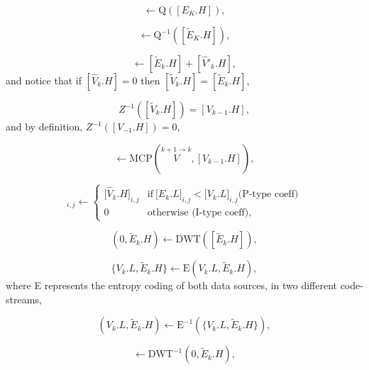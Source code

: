 \begin{equation}
  [\tilde{E}_k.H] \leftarrow \text{Q}([E_K.H]),
  \tag{d}
\end{equation}

\begin{equation}
  [\tilde{E}_k.H] \leftarrow  \text{Q}^{-1}([\tilde{E}_K.H]),
  \tag{E.g}
\end{equation}

\begin{equation}
  [\tilde{V}_k.H] \leftarrow [\tilde{E}_k.H] + [\hat{V}'_k.H],
  \tag{E.h}
\end{equation}
and notice that if $[\hat{V}_k.H]=0$ then $[\tilde{V}_k.H] =
[\tilde{E}_k.H]$,

\begin{equation}
  Z^{-1}([\tilde{V}_k.H]) = [V_{k-1}.H],
  \tag{E.i}
\end{equation}
and by definition, $Z^{-1}([V_{-1}.H]) = 0$,

\begin{equation}
  [\hat{V}_k.H] \leftarrow \text{MCP}(\overset{k+1\rightarrow k}{V}, [V_{k-1}.H]),
  \tag{E.j}
\end{equation}

\begin{equation}
  [\hat{V}'_k.H]_{i,j} \leftarrow \left\{
    \begin{array}{ll}
      {[}\hat{V}_k.H{]}_{i,j}  & \text{if}~{[}E_k.L{]}_{i,j} < {[}V_k.L{]}_{i,j} \text{(P-type coeff)} \\
      0                       & \text{otherwise (I-type coeff)},
    \end{array}
  \right.
  \tag{E.k}
\end{equation}
  
\begin{equation}
  (0, \tilde{E}_k.H) \leftarrow \text{DWT}([\tilde{E}_k.H]),
  \tag{f}
\end{equation}

\begin{equation}
  \{V_k.L, \tilde{E}_k.H\} \leftarrow \text{E}(V_k.L, \tilde{E}_k.H),
  \tag{g}
\end{equation}
where E represents the entropy coding of both data sources, in two
different code-streams,

\begin{equation}
  (V_k.L, \tilde{E}_k.H) \leftarrow \text{E}^{-1}(\{V_k.L, \tilde{E}_k.H\}),
  \tag{h}
\end{equation}

\begin{equation}
  [\tilde{E}_k.H] \leftarrow \text{DWT}^{-1}(0, \tilde{E}_k.H),
  \tag{i}
\end{equation}

